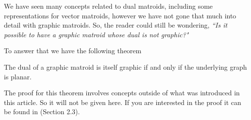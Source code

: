 %

We have seen many concepts related to dual matroids, including some representations for vector matroids, however we have not gone that much into detail with graphic matroids. So, the reader could still be wondering, \textit{``Is it possible to have a graphic matroid whose dual is not graphic?"}

To answer that we have the following theorem

\begin{theorem}
    The dual of a graphic matroid is itself graphic if and only if the underlying graph is planar.
\end{theorem}
The proof for this theorem involves concepts outside of what was introduced in this article. So it will not be given here. If you are interested in the proof it can be found in \cite{oxley1} (Section 2.3).

